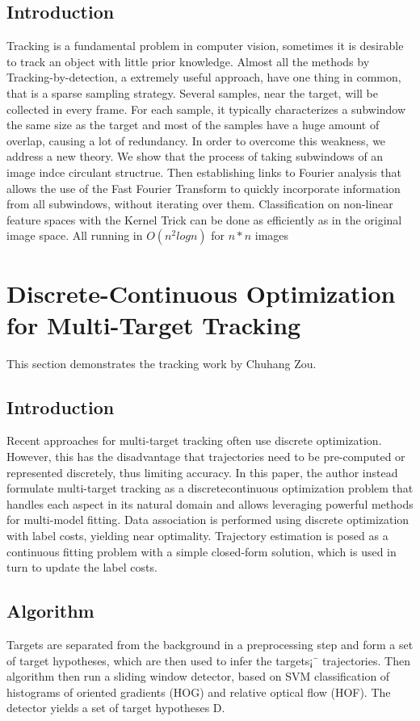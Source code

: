 \documentclass{article}
\begin{document}
\subsection{Introduction}
Tracking is a fundamental problem in computer vision, sometimes it is desirable to track an object with little prior knowledge. Almost all the methods by Tracking-by-detection, a extremely useful approach, have one thing in common, that is a sparse sampling strategy. Several samples, near the target, will be collected in every frame. For each sample, it typically characterizes a subwindow the same size as the target and most of the samples have a huge amount of overlap, causing a lot of redundancy. In order to overcome this weakness, we address a new theory. We show that the process of taking subwindows of an image indce circulant structrue. Then establishing links to Fourier analysis that allows the use of the Fast Fourier Transform to quickly incorporate information from all subwindows, without iterating over them. Classification on non-linear feature spaces with the Kernel Trick can be done as efficiently as in the original image space. All running in $O(n^2 logn)$ for $n * n$ images

\section{Discrete-Continuous Optimization for Multi-Target Tracking}
This section demonstrates the tracking work by Chuhang Zou.
\subsection{Introduction}
Recent approaches for multi-target tracking often use discrete optimization. However, this has the disadvantage that trajectories need to be pre-computed or represented discretely, thus limiting accuracy. In this paper, the author instead formulate multi-target tracking as a discretecontinuous optimization problem that handles each aspect in its natural domain and allows leveraging powerful methods for multi-model fitting. Data association is performed using discrete optimization with label costs, yielding near optimality. Trajectory estimation is posed as a continuous fitting problem with a simple closed-form solution, which is used in turn to update the label costs.
\subsection{Algorithm}
Targets are separated from the background in a preprocessing step and form a set of target hypotheses, which are then used to infer the targets¡¯ trajectories. Then algorithm then run a sliding window detector, based on SVM classification of histograms of oriented gradients (HOG) and relative optical flow (HOF). The detector yields a set of target hypotheses D.
\end{document}

